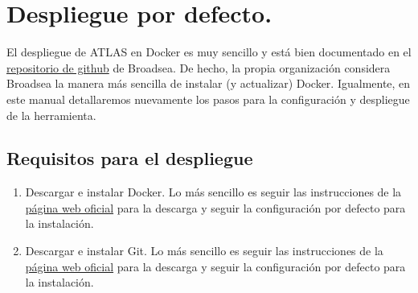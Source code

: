 \chapter{Despliegue por defecto.}

El despliegue de ATLAS en Docker es muy sencillo y está bien documentado en el  \href{https://github.com/OHDSI/Broadsea}{repositorio de github} de Broadsea. De hecho, la propia organización considera Broadsea la manera más sencilla de instalar (y actualizar) Docker. Igualmente, en este manual detallaremos nuevamente los pasos para la configuración y despliegue de la herramienta.

\section{Requisitos para el despliegue}

\begin{enumerate}
    \item Descargar e instalar Docker. Lo más sencillo es seguir las instrucciones de la \href{https://docs.docker.com/engine/install/}{página web oficial} para la descarga y seguir la configuración por defecto para la instalación.
    
    \item Descargar e instalar Git. Lo más sencillo es seguir las instrucciones de la \href{https://git-scm.com/downloads}{página web oficial} para la descarga y seguir la configuración por defecto para la instalación.
\end{enumerate}

